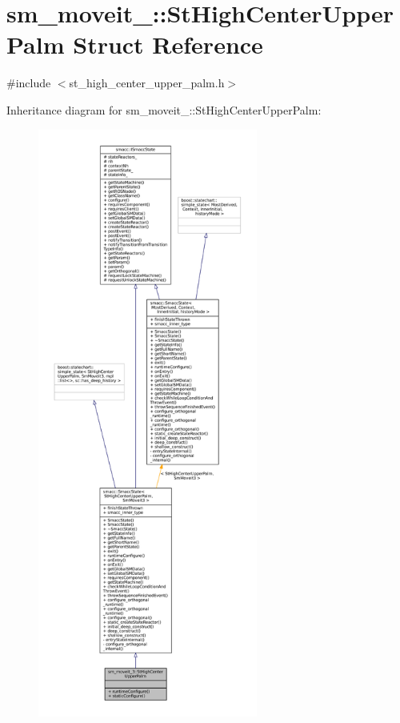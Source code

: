 \hypertarget{structsm__moveit__3_1_1StHighCenterUpperPalm}{}\section{sm\+\_\+moveit\+\_\+:\+:St\+High\+Center\+Upper\+Palm Struct Reference}
\label{structsm__moveit__3_1_1StHighCenterUpperPalm}


{\ttfamily \#include $<$st\+\_\+high\+\_\+center\+\_\+upper\+\_\+palm.\+h$>$}



Inheritance diagram for sm\+\_\+moveit\+\_\+:\+:St\+High\+Center\+Upper\+Palm\+:
\nopagebreak
\begin{figure}[H]
\begin{center}
\leavevmode
\includegraphics[height=550pt]{structsm__moveit__3_1_1StHighCenterUpperPalm__inherit__graph}
\end{center}
\end{figure}


